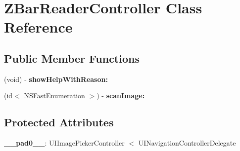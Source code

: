 \hypertarget{interface_z_bar_reader_controller}{
\section{ZBarReaderController Class Reference}
\label{interface_z_bar_reader_controller}
}
\subsection*{Public Member Functions}
\begin{DoxyCompactItemize}
\item 
\hypertarget{interface_z_bar_reader_controller_a5026f865f6d7e52204837e91d542ece5}{
(void) -\/ {\bfseries showHelpWithReason:}}
\label{interface_z_bar_reader_controller_a5026f865f6d7e52204837e91d542ece5}

\item 
\hypertarget{interface_z_bar_reader_controller_a7f0b5e0a9c70d3d682ba0bc6c5e470f8}{
(id$<$ NSFastEnumeration $>$) -\/ {\bfseries scanImage:}}
\label{interface_z_bar_reader_controller_a7f0b5e0a9c70d3d682ba0bc6c5e470f8}

\end{DoxyCompactItemize}
\subsection*{Protected Attributes}
\begin{DoxyCompactItemize}
\item 
\hypertarget{interface_z_bar_reader_controller_ace9ebbc1e4e28551d313564ddf0e80ca}{
{\bfseries \_\-\_\-pad0\_\-\_\-}: UIImagePickerController $<$ UINavigationControllerDelegate}
\label{interface_z_bar_reader_controller_ace9ebbc1e4e28551d313564ddf0e80ca}

\end{DoxyCompactItemize}
